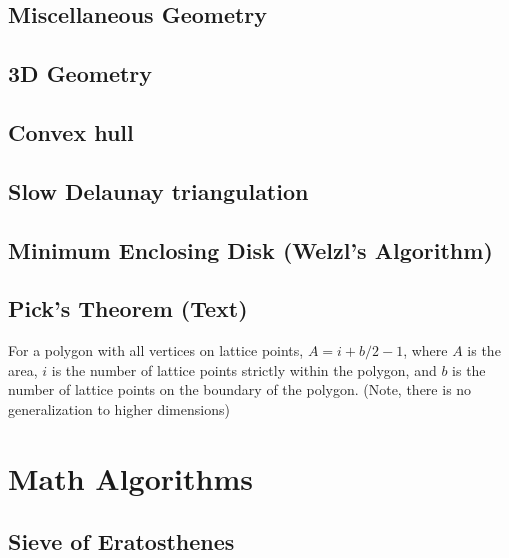 \documentclass[10pt]{extarticle}
\begin{document}
\begin{multicols*}{3}
\subsection{Miscellaneous Geometry} %


\subsection{3D Geometry}


\subsection{Convex hull} %


\subsection{Slow Delaunay triangulation} %


\subsection{Minimum Enclosing Disk (Welzl's Algorithm)} %


\subsection{Pick's Theorem (Text)} %
For a polygon with all vertices on lattice points, $A = i + b/2 - 1$, where $A$
is the area, $i$ is the number of lattice points strictly within the polygon,
and $b$ is the number of lattice points on the boundary of the polygon. (Note,
there is no generalization to higher dimensions)

\section{Math Algorithms}

\subsection{Sieve of Eratosthenes}



\end{multicols*}
\end{document}

